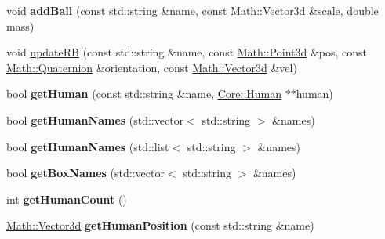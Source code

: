 \begin{DoxyCompactItemize}
\item 
\hypertarget{classCartWheel_1_1CartWheel3D_a9c8888a45361848e850326d36dbd3c81}{
void {\bfseries addBall} (const std::string \&name, const \hyperlink{classCartWheel_1_1Math_1_1Vector3d}{Math::Vector3d} \&scale, double mass)}
\label{classCartWheel_1_1CartWheel3D_a9c8888a45361848e850326d36dbd3c81}

\item 
void \hyperlink{classCartWheel_1_1CartWheel3D_ae988c01d49c442a2c9edb1798b3f897e}{updateRB} (const std::string \&name, const \hyperlink{classCartWheel_1_1Math_1_1Point3d}{Math::Point3d} \&pos, const \hyperlink{classCartWheel_1_1Math_1_1Quaternion}{Math::Quaternion} \&orientation, const \hyperlink{classCartWheel_1_1Math_1_1Vector3d}{Math::Vector3d} \&vel)
\item 
\hypertarget{classCartWheel_1_1CartWheel3D_a7a706fb0424aa67fea984cab69311610}{
bool {\bfseries getHuman} (const std::string \&name, \hyperlink{classCartWheel_1_1Core_1_1Human}{Core::Human} $\ast$$\ast$human)}
\label{classCartWheel_1_1CartWheel3D_a7a706fb0424aa67fea984cab69311610}

\item 
\hypertarget{classCartWheel_1_1CartWheel3D_a45b5f9697ab7fbf907d7982caaa5f7c8}{
bool {\bfseries getHumanNames} (std::vector$<$ std::string $>$ \&names)}
\label{classCartWheel_1_1CartWheel3D_a45b5f9697ab7fbf907d7982caaa5f7c8}

\item 
\hypertarget{classCartWheel_1_1CartWheel3D_a6c81534a19765dbfb579e813f639d565}{
bool {\bfseries getHumanNames} (std::list$<$ std::string $>$ \&names)}
\label{classCartWheel_1_1CartWheel3D_a6c81534a19765dbfb579e813f639d565}

\item 
\hypertarget{classCartWheel_1_1CartWheel3D_ab4da14f4957c5206748b754e3bf12c36}{
bool {\bfseries getBoxNames} (std::vector$<$ std::string $>$ \&names)}
\label{classCartWheel_1_1CartWheel3D_ab4da14f4957c5206748b754e3bf12c36}

\item 
\hypertarget{classCartWheel_1_1CartWheel3D_ac8b3aa7833a3999b0d4c28f9ff3e9883}{
int {\bfseries getHumanCount} ()}
\label{classCartWheel_1_1CartWheel3D_ac8b3aa7833a3999b0d4c28f9ff3e9883}

\item 
\hypertarget{classCartWheel_1_1CartWheel3D_a2e4cfbe110cc215251735d2aca12ddc0}{
\hyperlink{classCartWheel_1_1Math_1_1Vector3d}{Math::Vector3d} {\bfseries getHumanPosition} (const std::string \&name)}
\label{classCartWheel_1_1CartWheel3D_a2e4cfbe110cc215251735d2aca12ddc0}


\end{DoxyCompactItemize}
